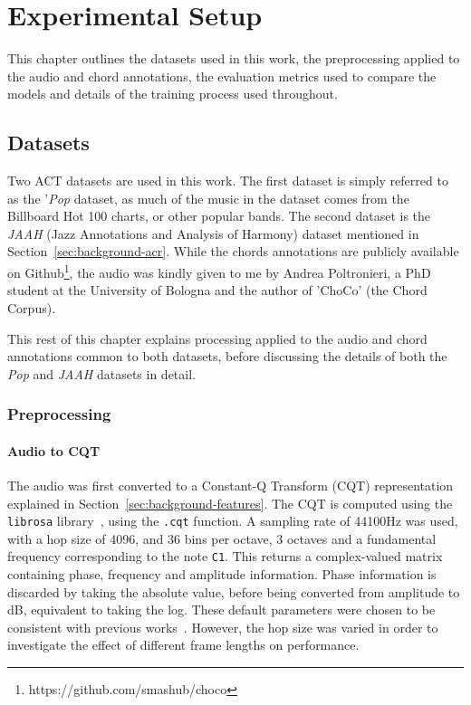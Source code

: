 \chapter{Experimental Setup}

This chapter outlines the datasets used in this work, the preprocessing applied to the audio and chord annotations, the evaluation metrics used to compare the models and details of the training process used throughout.

\section{Datasets}

Two ACT datasets are used in this work. The first dataset is simply referred to as the '\emph{Pop} dataset, as much of the music in the dataset comes from the Billboard Hot 100 charts, or other popular bands. The second dataset is the \emph{JAAH} (Jazz Annotations and Analysis of Harmony) dataset mentioned in Section~\ref{sec:background-acr}. While the chords annotations are publicly available on Github\footnote{https://github.com/smashub/choco}, the audio was kindly given to me by Andrea Poltronieri, a PhD student at the University of Bologna and the author of 'ChoCo' (the Chord Corpus).

This rest of this chapter explains processing applied to the audio and chord annotations common to both datasets, before discussing the details of both the \emph{Pop} and \emph{JAAH} datasets in detail.

\subsection{Preprocessing}

\subsubsection{Audio to CQT}\label{sec:audio-to-cqt}

The audio was first converted to a Constant-Q Transform (CQT) representation explained in Section~\ref{sec:background-features}. The CQT is computed using the \texttt{librosa} library~\cite{librosa}, using the \texttt{.cqt} function. A sampling rate of 44100Hz was used, with a hop size of 4096, and 36 bins per octave, 3 octaves and a fundamental frequency corresponding to the note \texttt{C1}. This returns a complex-valued matrix containing phase, frequency and amplitude information. Phase information is discarded by taking the absolute value, before being converted from amplitude to dB, equivalent to taking the log.  These default parameters were chosen to be consistent with previous works~\cite{StructuredTraining}. However, the hop size was varied in order to investigate the effect of different frame lengths on performance.

